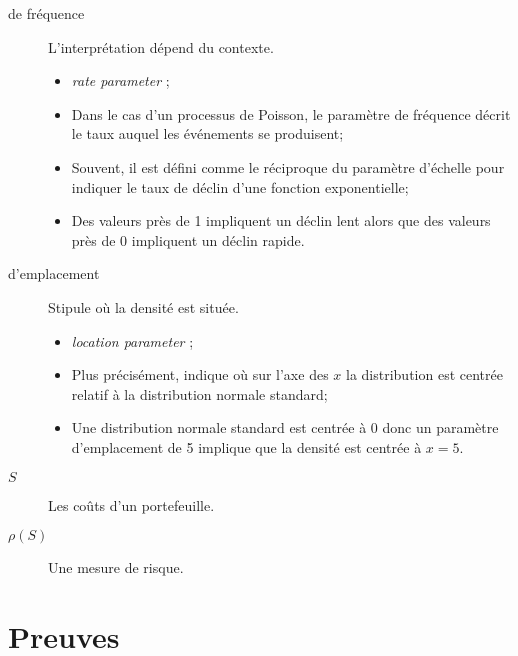 \documentclass[10pt, french]{article}
\begin{document}
\begin{multicols*}{2}
\begin{description}
\begin{center}
\begin{tikzpicture}[x=0.75pt,y=0.75pt,yscale=-1,xscale=1]
\end{tikzpicture}
		\end{center}
	\item[de fréquence]	L'interprétation dépend du contexte.
		\begin{itemize}
		\item	\og \textit{rate parameter} \fg{};
		\item	Dans le cas d'un processus de Poisson, le paramètre de fréquence décrit le taux auquel les événements se produisent;
		\item	Souvent, il est défini comme le réciproque du paramètre d'échelle pour indiquer le taux de déclin d'une fonction exponentielle;
		\item	Des valeurs près de 1 impliquent un déclin lent alors que des valeurs près de 0 impliquent un déclin rapide.
		\end{itemize}
	\item[d'emplacement]	Stipule où la densité est située.
		\begin{itemize}
		\item	\og \textit{location parameter} \fg{};
		\item	Plus précisément, indique où sur l'axe des $x$ la distribution est centrée relatif à la distribution normale standard;
		\item	Une distribution normale standard est centrée à 0 donc un paramètre d'emplacement de 5 implique que la densité est centrée à $x	=	5$.
		\end{itemize}
\end{description}


\begin{distributions}[Notation]
\begin{description}
	\item[$S$]	Les coûts d'un portefeuille.
	\item[$\rho(S)$]	Une mesure de risque.
\end{description}
\end{distributions}



\pagebreak

\section{Preuves}


\end{multicols*}
\end{document}
